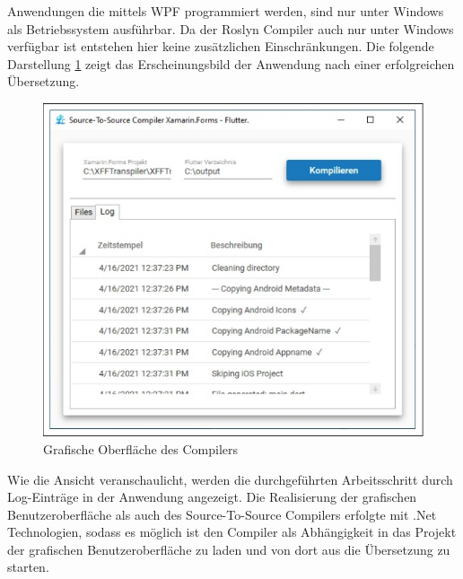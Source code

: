 Anwendungen die mittels WPF programmiert werden, sind nur unter Windows als Betriebssystem ausführbar.  Da der Roslyn Compiler auch nur unter Windows verfügbar ist entstehen hier keine zusätzlichen Einschränkungen.  Die folgende Darstellung \ref{fig:CompilerUI} zeigt das Erscheinungsbild der Anwendung nach einer erfolgreichen Übersetzung.

\begin{figure}[!ht]
 \includegraphics[width=\textwidth,keepaspectratio]{Images/Implementation/UiScreenshot.png}
 \caption{Grafische Oberfläche des Compilers}
 \label{fig:CompilerUI}
\end{figure}

Wie die Ansicht veranschaulicht, werden die durchgeführten Arbeitsschritt durch Log-Einträge in der Anwendung angezeigt.
Die Realisierung der grafischen Benutzeroberfläche als auch des Source-To-Source Compilers erfolgte mit  .Net Technologien,  sodass es möglich ist den Compiler als Abhängigkeit in das Projekt der grafischen Benutzeroberfläche zu laden und von dort aus die Übersetzung zu starten.  


